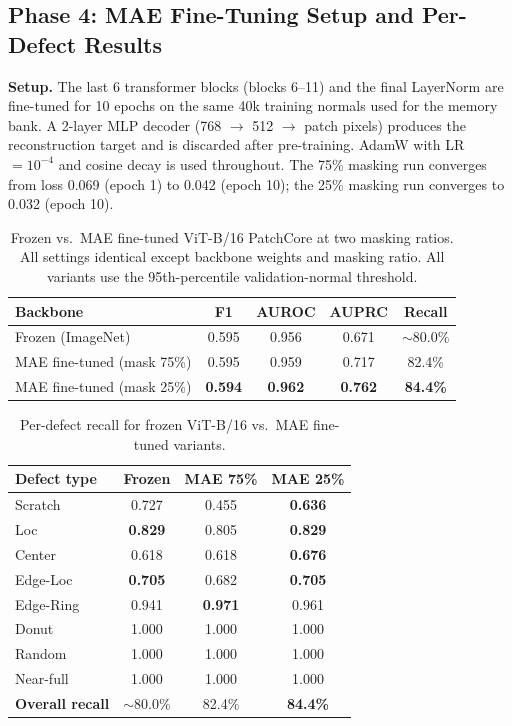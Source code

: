 \subsection{Phase 4: MAE Fine-Tuning Setup and Per-Defect Results}
\label{app:mae_finetune}

\textbf{Setup.} The last 6 transformer blocks (blocks 6--11) and the final LayerNorm are fine-tuned for 10 epochs on the same 40k training normals used for the memory bank. A 2-layer MLP decoder (768 $\to$ 512 $\to$ patch pixels) produces the reconstruction target and is discarded after pre-training. AdamW with LR $=10^{-4}$ and cosine decay is used throughout. The 75\% masking run converges from loss 0.069 (epoch 1) to 0.042 (epoch 10); the 25\% masking run converges to 0.032 (epoch 10).

\begin{table}[H]
\centering
\caption{Frozen vs.\ MAE fine-tuned ViT-B/16 PatchCore at two masking ratios. All settings identical except backbone weights and masking ratio. All variants use the 95th-percentile validation-normal threshold.}
\label{tab:vit_mae_comparison}
\begin{tabular}{lcccc}
\toprule
Backbone & F1 & AUROC & AUPRC & Recall \\
\midrule
Frozen (ImageNet)          & 0.595          & 0.956          & 0.671          & ${\sim}$80.0\% \\
MAE fine-tuned (mask 75\%) & 0.595          & 0.959          & 0.717          & 82.4\% \\
MAE fine-tuned (mask 25\%) & \textbf{0.594} & \textbf{0.962} & \textbf{0.762} & \textbf{84.4\%} \\
\bottomrule
\end{tabular}
\end{table}

\begin{table}[H]
\centering
\caption{Per-defect recall for frozen ViT-B/16 vs.\ MAE fine-tuned variants.}
\label{tab:vit_mae_per_defect}
\begin{tabular}{lccc}
\toprule
\textbf{Defect type} & \textbf{Frozen} & \textbf{MAE 75\%} & \textbf{MAE 25\%} \\
\midrule
Scratch   & 0.727          & 0.455 & \textbf{0.636} \\
Loc       & \textbf{0.829} & 0.805 & \textbf{0.829} \\
Center    & 0.618          & 0.618 & \textbf{0.676} \\
Edge-Loc  & \textbf{0.705} & 0.682 & \textbf{0.705} \\
Edge-Ring & 0.941          & \textbf{0.971} & 0.961 \\
Donut     & 1.000          & 1.000 & 1.000 \\
Random    & 1.000          & 1.000 & 1.000 \\
Near-full & 1.000          & 1.000 & 1.000 \\
\midrule
\textbf{Overall recall} & ${\sim}$80.0\% & 82.4\% & \textbf{84.4\%} \\
\bottomrule
\end{tabular}
\end{table}


